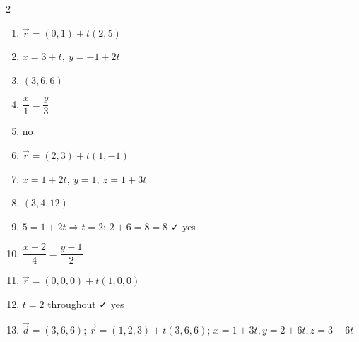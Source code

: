 \documentclass[11pt]{article}
\begin{document}
\begin{keybox}
\begin{multicols}{2}
\small
\begin{enumerate}[leftmargin=*,itemsep=3pt]
  \item $\vec r=(0,1)+t(2,5)$
  \item $x=3+t,\ y=-1+2t$
  \item $(3,6,6)$
  \item $\dfrac{x}{1}=\dfrac{y}{3}$
  \item no
  \item $\vec r=(2,3)+t(1,-1)$
  \item $x=1+2t,\ y=1,\ z=1+3t$
  \item $(3,4,12)$
  \item $5=1+2t\Rightarrow t=2$; $2+6=8=8$ ✓ yes
  \item $\dfrac{x-2}{4}=\dfrac{y-1}{2}$
  \item $\vec r=(0,0,0)+t(1,0,0)$
  \item $t=2$ throughout ✓ yes
  \item $\vec d=(3,6,6)$; $\vec r=(1,2,3)+t(3,6,6)$; $x=1+3t,y=2+6t,z=3+6t$
\end{enumerate}
\end{multicols}
\end{keybox}
\end{document}
